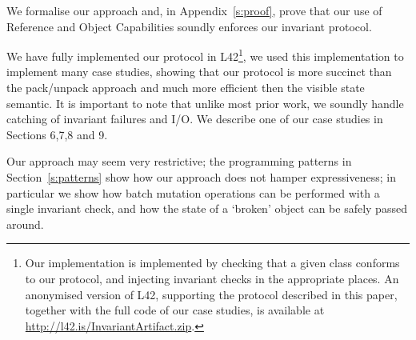 We formalise our approach and, in Appendix~\ref{s:proof}, prove that our use of Reference and Object Capabilities soundly enforces our invariant protocol.

We have fully implemented our protocol in L42\footnote{
Our implementation is implemented by checking that a given class conforms to our protocol, and injecting invariant checks in the appropriate places.
An anonymised version of L42, supporting the protocol described in this paper, together with the full code of our case studies, is available at \url{http://l42.is/InvariantArtifact.zip}. %
}, we used this implementation to implement many case studies, showing that our protocol is more succinct than the pack/unpack approach and much more efficient then the visible state semantic.
It is important to note that unlike most prior work, we soundly handle catching of invariant failures and I/O.
We describe one of our case studies in Sections 6,7,8 and 9.

Our approach may seem very restrictive;
the programming patterns in Section~\ref{s:patterns} show how our approach does not hamper expressiveness; in particular we show how batch mutation operations can be performed with a single invariant check, and how the state of a `broken' object can be safely passed around.


